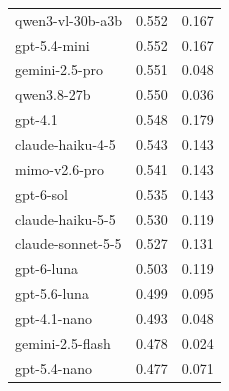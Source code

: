 \begin{table}
\begin{tabular}{lrr}
qwen3-vl-30b-a3b & 0.552 & 0.167 \\
gpt-5.4-mini & 0.552 & 0.167 \\
gemini-2.5-pro & 0.551 & 0.048 \\
qwen3.8-27b & 0.550 & 0.036 \\
gpt-4.1 & 0.548 & 0.179 \\
claude-haiku-4-5 & 0.543 & 0.143 \\
mimo-v2.6-pro & 0.541 & 0.143 \\
gpt-6-sol & 0.535 & 0.143 \\
claude-haiku-5-5 & 0.530 & 0.119 \\
claude-sonnet-5-5 & 0.527 & 0.131 \\
gpt-6-luna & 0.503 & 0.119 \\
gpt-5.6-luna & 0.499 & 0.095 \\
gpt-4.1-nano & 0.493 & 0.048 \\
gemini-2.5-flash & 0.478 & 0.024 \\
gpt-5.4-nano & 0.477 & 0.071 \\
\bottomrule
\end{tabular}
\end{table}
